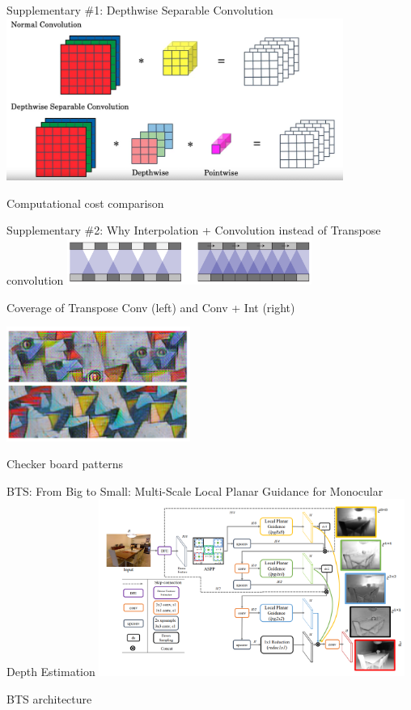 \documentclass[10pt]{beamer}
\begin{document}
\begin{frame}{Supplementary \#1: Depthwise Separable Convolution}
    \centering
    \includegraphics[width=11cm]{DSconv.png}\par
    Computational cost comparison
\end{frame}

\begin{frame}{Supplementary \#2: Why Interpolation + Convolution instead of Transpose convolution}
    \centering
    \includegraphics[width=8cm]{TransposeConv2.png}\par
    Coverage of Transpose Conv (left) and Conv + Int (right)
    
    \centering
    \includegraphics[width=6cm]{TransposeConv.PNG}\par
    Checker board patterns
\end{frame}

\begin{frame}{BTS: From Big to Small: Multi-Scale Local Planar Guidance for Monocular Depth Estimation}
    \centering
    \includegraphics[width=10cm]{bts_architecture.png}\par
    BTS architecture \cite{bts}
\end{frame}
\end{document}
